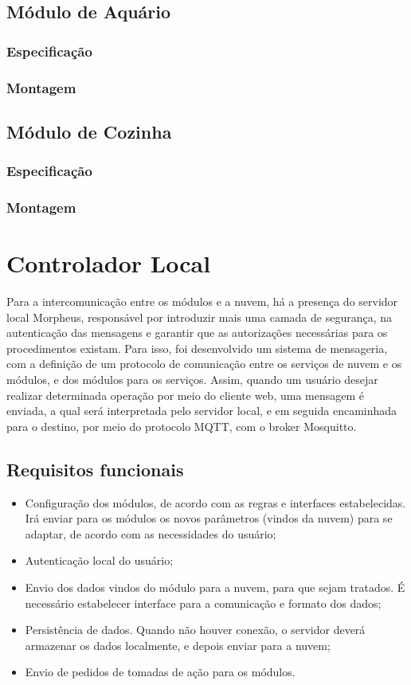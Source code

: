 \subsection{Módulo de Aquário}
\subsubsection{Especificação}
\subsubsection{Montagem}

\subsection{Módulo de Cozinha}
\subsubsection{Especificação}
\subsubsection{Montagem}

\section{Controlador Local}
Para a intercomunicação entre os módulos e a nuvem, há a presença do servidor local Morpheus, responsável por introduzir mais uma camada de segurança, na autenticação das mensagens e garantir que as autorizações necessárias para os procedimentos existam. Para isso, foi desenvolvido um sistema de mensageria, com a definição de um protocolo de comunicação entre os serviços de nuvem e os módulos, e dos módulos para os serviços. Assim, quando um usuário desejar realizar determinada operação por meio do cliente web, uma mensagem é enviada, a qual será interpretada pelo servidor local, e em seguida encaminhada para o destino, por meio do protocolo MQTT, com o broker Mosquitto.

\subsection{Requisitos funcionais}
\begin{itemize}
\item Configuração dos módulos, de acordo com as regras e interfaces estabelecidas. Irá enviar para os módulos os novos parâmetros (vindos da nuvem) para se adaptar, de acordo com as necessidades do usuário;
\item Autenticação local do usuário;
\item Envio dos dados vindos do módulo para a nuvem, para que sejam tratados. É necessário estabelecer interface para a comunicação e formato dos dados;
\item Persistência de dados. Quando não houver conexão, o servidor deverá armazenar os dados localmente, e depois enviar para a nuvem;
\item Envio de pedidos de tomadas de ação para os módulos.
\end{itemize}

